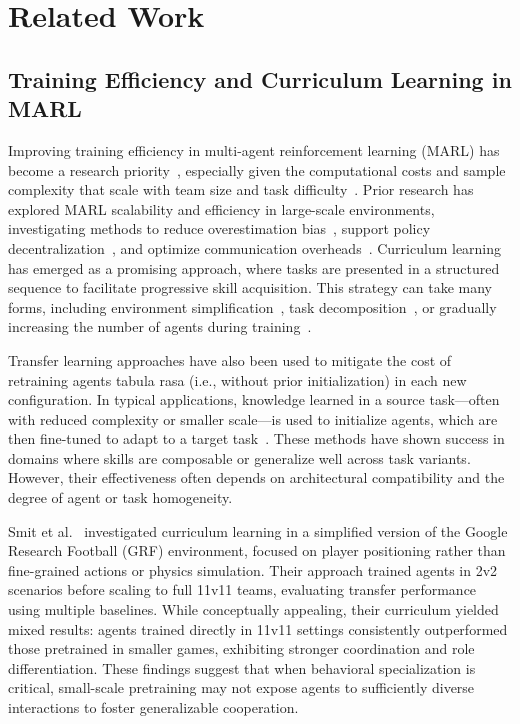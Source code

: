 \documentclass{article}
\begin{document}
\section{Related Work}
\subsection{Training Efficiency and Curriculum Learning in MARL}

Improving training efficiency in multi-agent reinforcement learning (MARL) has become a research 
priority~\cite{canese2021,krouka2022}, especially given the computational costs and sample 
complexity that scale with team size and task difficulty~\cite{shoham2007,busoniu2008}. 
Prior research has explored MARL scalability and efficiency in large-scale environments, 
investigating methods to reduce overestimation bias~\cite{ackermann2019}, support policy 
decentralization~\cite{foerster2017,lowe2020}, and optimize communication 
overheads~\cite{sukhbaatar2016,wei2022}. Curriculum learning has emerged as a promising approach, 
where tasks are presented in a structured sequence to facilitate progressive skill acquisition. 
This strategy can take many forms, including environment simplification~\cite{shukla2022}, 
task decomposition~\cite{shi2023}, or gradually increasing the number of agents 
during training~\cite{smit2023, albrecht2024}.

Transfer learning approaches have also been used to mitigate the cost of retraining agents 
tabula rasa (i.e., without prior initialization) in each new configuration. 
In typical applications, knowledge learned in a source task—often with reduced 
complexity or smaller scale—is used to initialize agents, 
which are then fine-tuned to adapt to a target task~\cite{cui2022}. 
These methods have shown success in domains where skills are composable 
or generalize well across task variants. However, their effectiveness often 
depends on architectural compatibility and the degree of agent or task homogeneity.

Smit et al.~\cite{smit2023} investigated curriculum learning in a simplified version of the 
Google Research Football (GRF) environment, focused on player positioning rather than 
fine-grained actions or physics simulation. Their approach trained agents in 2v2 scenarios 
before scaling to full 11v11 teams, evaluating transfer performance using multiple baselines. 
While conceptually appealing, their curriculum yielded mixed results: agents trained directly 
in 11v11 settings consistently outperformed those pretrained in smaller games, exhibiting 
stronger coordination and role differentiation. These findings suggest that when behavioral 
specialization is critical, small-scale pretraining may not expose agents to sufficiently 
diverse interactions to foster generalizable cooperation.
\end{document}

